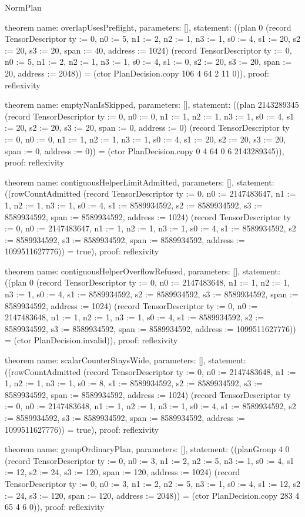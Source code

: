 \begin{lexlean}{NormPlan}
\begin{semanticmodule}
theorem{
  name: overlapUsesPreflight,
  parameters: [],
  statement: ((plan 0 (record TensorDescriptor {ty := 0, n0 := 5, n1 := 2, n2 := 1, n3 := 1, s0 := 4, s1 := 20, s2 := 20, s3 := 20, span := 40, address := 1024}) (record TensorDescriptor {ty := 0, n0 := 5, n1 := 2, n2 := 1, n3 := 1, s0 := 4, s1 := 0, s2 := 20, s3 := 20, span := 20, address := 2048})) = (ctor PlanDecision.copy 106 4 64 2 11 0)),
  proof: reflexivity{}
}

theorem{
  name: emptyNanIsSkipped,
  parameters: [],
  statement: ((plan 2143289345 (record TensorDescriptor {ty := 0, n0 := 0, n1 := 1, n2 := 1, n3 := 1, s0 := 4, s1 := 20, s2 := 20, s3 := 20, span := 0, address := 0}) (record TensorDescriptor {ty := 0, n0 := 0, n1 := 1, n2 := 1, n3 := 1, s0 := 4, s1 := 20, s2 := 20, s3 := 20, span := 0, address := 0})) = (ctor PlanDecision.copy 0 4 64 0 6 2143289345)),
  proof: reflexivity{}
}

theorem{
  name: contiguousHelperLimitAdmitted,
  parameters: [],
  statement: ((rowCountAdmitted (record TensorDescriptor {ty := 0, n0 := 2147483647, n1 := 1, n2 := 1, n3 := 1, s0 := 4, s1 := 8589934592, s2 := 8589934592, s3 := 8589934592, span := 8589934592, address := 1024}) (record TensorDescriptor {ty := 0, n0 := 2147483647, n1 := 1, n2 := 1, n3 := 1, s0 := 4, s1 := 8589934592, s2 := 8589934592, s3 := 8589934592, span := 8589934592, address := 1099511627776})) = true),
  proof: reflexivity{}
}

theorem{
  name: contiguousHelperOverflowRefused,
  parameters: [],
  statement: ((plan 0 (record TensorDescriptor {ty := 0, n0 := 2147483648, n1 := 1, n2 := 1, n3 := 1, s0 := 4, s1 := 8589934592, s2 := 8589934592, s3 := 8589934592, span := 8589934592, address := 1024}) (record TensorDescriptor {ty := 0, n0 := 2147483648, n1 := 1, n2 := 1, n3 := 1, s0 := 4, s1 := 8589934592, s2 := 8589934592, s3 := 8589934592, span := 8589934592, address := 1099511627776})) = (ctor PlanDecision.invalid)),
  proof: reflexivity{}
}

theorem{
  name: scalarCounterStaysWide,
  parameters: [],
  statement: ((rowCountAdmitted (record TensorDescriptor {ty := 0, n0 := 2147483648, n1 := 1, n2 := 1, n3 := 1, s0 := 8, s1 := 8589934592, s2 := 8589934592, s3 := 8589934592, span := 8589934592, address := 1024}) (record TensorDescriptor {ty := 0, n0 := 2147483648, n1 := 1, n2 := 1, n3 := 1, s0 := 4, s1 := 8589934592, s2 := 8589934592, s3 := 8589934592, span := 8589934592, address := 1099511627776})) = true),
  proof: reflexivity{}
}

theorem{
  name: groupOrdinaryPlan,
  parameters: [],
  statement: ((planGroup 4 0 (record TensorDescriptor {ty := 0, n0 := 3, n1 := 2, n2 := 5, n3 := 1, s0 := 4, s1 := 12, s2 := 24, s3 := 120, span := 120, address := 1024}) (record TensorDescriptor {ty := 0, n0 := 3, n1 := 2, n2 := 5, n3 := 1, s0 := 4, s1 := 12, s2 := 24, s3 := 120, span := 120, address := 2048})) = (ctor PlanDecision.copy 283 4 65 4 6 0)),
  proof: reflexivity{}
}


\end{semanticmodule}
\end{lexlean}
